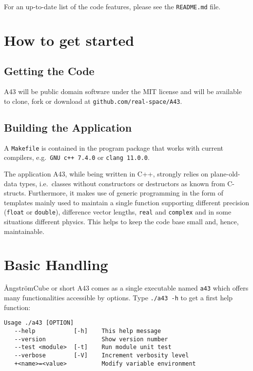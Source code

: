 \documentclass[oribibl]{llncs}
\newcommand{\ttt}[1]{\texttt{#1}}
\newcommand{\fullcodename}{\AA{}ngstr\"{o}mCube}
\newcommand{\codename}{A43}
\begin{document}
\noindent
For an up-to-date list of the code features, please see the \ttt{README.md} file.

\section{How to get started} \label{sec:how-to-get-started}
%
\subsection{Getting the Code} \label{sec:getting-the-code}
\codename{} will be public domain software under the MIT license
and will be available to clone, fork or download at \ttt{github.com/real-space/A43}. 

\subsection{Building the Application} \label{sec:compiling}
%
A \ttt{Makefile} is contained in the program package that works with current compilers, e.g.~\ttt{GNU c++ 7.4.0} or \ttt{clang 11.0.0}.

The application \codename{}, while being written in C++, strongly relies on plane-old-data types,
i.e.~classes without constructors or destructors as known from C-structs.
Furthermore, it makes use of generic programming in the form of templates
mainly used to maintain a single function supporting different precision (\ttt{float} or \ttt{double}), 
difference vector lengths, \ttt{real} and \ttt{complex} and in some situations different physics.
This helps to keep the code base small and, hence, maintainable.

\section{Basic Handling} \label{sec:basic-handling}
%
\fullcodename{} or short \codename{} comes as a single executable named \ttt{a43} which
offers many functionalities accessible by options. Type \ttt{./a43 -h}
to get a first help function:
\begin{verbatim}
Usage ./a43 [OPTION]
   --help           [-h]	This help message
   --version            	Show version number
   --test <module>  [-t]	Run module unit test
   --verbose        [-V]	Increment verbosity level
   +<name>=<value>      	Modify variable environment
\end{verbatim}
\end{document}
